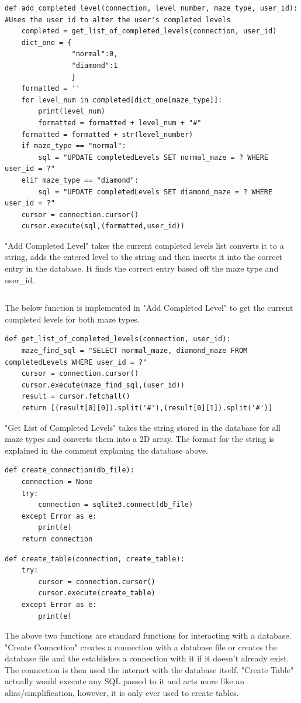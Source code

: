 \documentclass{article}
\begin{document}
\begin{lstlisting}
def add_completed_level(connection, level_number, maze_type, user_id):    #Uses the user id to alter the user's completed levels
    completed = get_list_of_completed_levels(connection, user_id)
    dict_one = {
                "normal":0,
                "diamond":1
                }
    formatted = ''
    for level_num in completed[dict_one[maze_type]]:
        print(level_num)
        formatted = formatted + level_num + "#"
    formatted = formatted + str(level_number)
    if maze_type == "normal":
        sql = "UPDATE completedLevels SET normal_maze = ? WHERE user_id = ?"
    elif maze_type == "diamond":
        sql = "UPDATE completedLevels SET diamond_maze = ? WHERE user_id = ?"
    cursor = connection.cursor()
    cursor.execute(sql,(formatted,user_id))
\end{lstlisting}
"Add Completed Level" takes the current completed levels list converts it to a string,  adds the entered level to the string and then inserts
it into the correct entry in the database. It finds the correct entry based off the maze type and user\_id.
\begin{lstlisting}
\end{lstlisting}
The below function is implemented in "Add Completed Level" to get the current completed levels for both maze types.
\begin{lstlisting}
def get_list_of_completed_levels(connection, user_id):
    maze_find_sql = "SELECT normal_maze, diamond_maze FROM completedLevels WHERE user_id = ?"
    cursor = connection.cursor()
    cursor.execute(maze_find_sql,(user_id))
    result = cursor.fetchall()
    return [(result[0][0]).split('#'),(result[0][1]).split('#')]
\end{lstlisting}
"Get List of Completed Levels" takes the string stored in the database for all maze types and converts them into a 2D array. 
The format for the string is explained in the comment explaning the database above.

\clearpage
\begin{lstlisting}
def create_connection(db_file):
    connection = None
    try:
        connection = sqlite3.connect(db_file)
    except Error as e:
        print(e)
    return connection
\end{lstlisting}

\begin{lstlisting}
def create_table(connection, create_table):
    try:
        cursor = connection.cursor()
        cursor.execute(create_table)
    except Error as e:
        print(e)
\end{lstlisting}
The above two functions are standard functions for interacting with a database. "Create Conncetion" creates a connection with a database file or creates the
database file and the establishes a connection with it if it doesn't already exist. The connection is then used the interact with the database itself. "Create Table"
actually would execute any SQL passed to it and acts more like an alias/simplification, however, it is only ever used to create tables.
\end{document}
